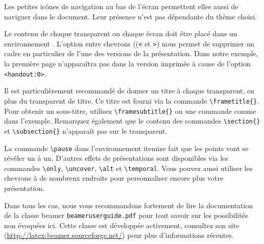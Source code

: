 Les petites icônes de navigation au bas de l'écran permettent elles
aussi de naviguer dans le document. Leur présence n'est pas dépendante
du thème choisi.

Le contenu de chaque transparent ou chaque écran doit être placé dans
un environnement . L'option entre chevrons ((\verb|<| et
\verb|>|) nous permet de supprimer un cadre en particulier de l'une des
versions de la présentation. Dans notre exemple, la première page
n'apparaîtra pas dans la version imprimée à cause de l'option
\verb|<handout:0>|.

Il est particulièrement recommandé de donner un titre à chaque
transparent, en plus du transparent de titre. Ce titre est fourni via
la commande \verb|\frametitle{}|. Pour obtenir un sous-titre,
utilisez \verb|\framesubtitle{}| ou une commande  comme dans
l'exemple. Remarquez également que le contenu des commandes \verb|\section{}|
et \verb|\subsection{}| n'apparaît pas sur le transparent.

La commande \verb|\pause| dans l'environnement itemize fait que les points
vont se révéler un à un. D'autres effets de présentations sont
disponibles via les commandes \verb|\only|, \verb|\uncover|,
\verb|\alt| et \verb|\temporal|. Vous pouvez aussi utiliser les
chevrons à de nombreux endroits pour personnaliser encore plus votre
présentation.

Dans tous les cas, nous vous recommandons fortement de lire la
documentation de la classe beamer \texttt{beameruserguide.pdf} pour
tout savoir sur les possibilités non évoquées ici. Cette classe est
développée activement, consultez son site
(\url{http://latex-beamer.sourceforge.net/})
pour plus d'informations récentes.



